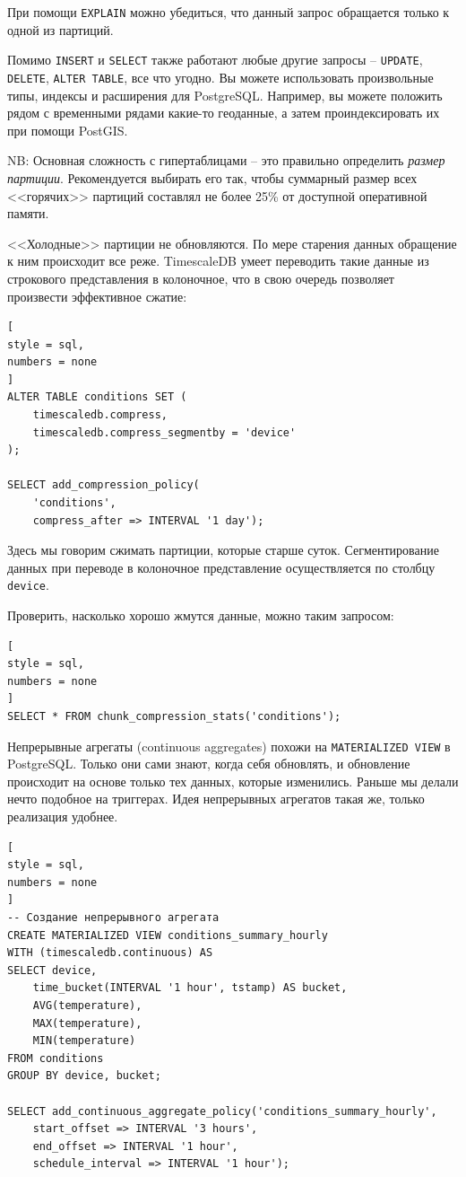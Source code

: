 \documentclass[%
	11pt,
	a4paper,
	utf8,
		]{article}
\begin{document}
При помощи \verb|EXPLAIN| можно убедиться, что данный запрос обращается только к одной из партиций.

Помимо \verb|INSERT| и \verb|SELECT| также работают любые другие запросы -- \verb|UPDATE|, \verb|DELETE|, \verb|ALTER TABLE|, все что угодно. Вы можете использовать произвольные типы, индексы и расширения для PostgreSQL. Например, вы можете положить рядом с временными рядами какие-то геоданные, а затем проиндексировать их при помощи PostGIS.

NB: Основная сложность с гипертаблицами -- это правильно определить \emph{размер партиции}. Рекомендуется выбирать его так, чтобы суммарный размер всех <<горячих>> партиций составлял не более 25\% от доступной оперативной памяти.

<<Холодные>> партиции не обновляются. По мере старения данных обращение к ним происходит все реже. TimescaleDB умеет переводить такие данные из строкового представления в колоночное, что в свою очередь позволяет произвести эффективное сжатие:
\begin{lstlisting}[
style = sql,
numbers = none
]
ALTER TABLE conditions SET (
	timescaledb.compress,
	timescaledb.compress_segmentby = 'device'
);

SELECT add_compression_policy(
	'conditions',
	compress_after => INTERVAL '1 day');
\end{lstlisting}

Здесь мы говорим сжимать партиции, которые старше суток. Сегментирование данных при переводе в колоночное представление осуществляется по столбцу \verb|device|.

Проверить, насколько хорошо жмутся данные, можно таким запросом:
\begin{lstlisting}[
style = sql,
numbers = none
]
SELECT * FROM chunk_compression_stats('conditions');
\end{lstlisting}

Непрерывные агрегаты (continuous aggregates) похожи на \verb|MATERIALIZED VIEW| в PostgreSQL. Только они сами знают, когда себя обновлять, и обновление происходит на основе только тех данных, которые изменились. Раньше мы делали нечто подобное на триггерах. Идея непрерывных агрегатов такая же, только реализация удобнее.
\begin{lstlisting}[
style = sql,
numbers = none
]
-- Создание непрерывного агрегата
CREATE MATERIALIZED VIEW conditions_summary_hourly
WITH (timescaledb.continuous) AS
SELECT device,
	time_bucket(INTERVAL '1 hour', tstamp) AS bucket,
	AVG(temperature),
	MAX(temperature),
	MIN(temperature)
FROM conditions
GROUP BY device, bucket;

SELECT add_continuous_aggregate_policy('conditions_summary_hourly',
	start_offset => INTERVAL '3 hours',
	end_offset => INTERVAL '1 hour',
	schedule_interval => INTERVAL '1 hour');
\end{lstlisting}
\end{document}
